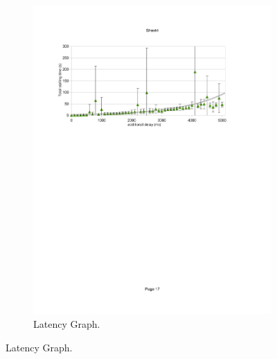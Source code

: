 \begin{figure}[htbp]
	\centering
    	\begin{subfigure}[b]{1.0\textwidth}
                \centering
                \includegraphics[width=\textwidth]{images/delay.pdf}
                \caption{Latency Graph.}
                \label{c3:fig:delayseries}
        \end{subfigure}


\end{figure}
